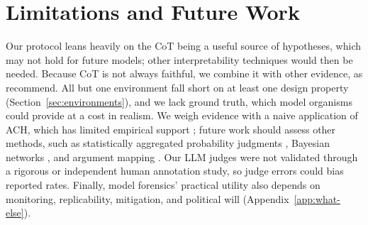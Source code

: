 \documentclass{article}
\begin{document}
\section{Limitations and Future Work}\label{sec:limitations}
Our protocol leans heavily on the CoT being a useful source of hypotheses, which may not hold for future models; other interpretability techniques would then be needed. Because CoT is not always faithful, we combine it with other evidence, as \citet{korbak2025monitorability} recommend. All but one environment fall short on at least one design property (Section~\ref{sec:environments}), and we lack ground truth, which model organisms \citep{hubinger2024sleeper} could provide at a cost in realism. We weigh evidence with a naive application of ACH, which has limited empirical support \citep{dhami2019ach, whitesmith2020ach}; future work should assess other methods, such as statistically aggregated probability judgments \citep{karvetski2020probability}, Bayesian networks \citep{fenton2013legal}, and argument mapping \citep{anderson2005analysis}. Our LLM judges were not validated through a rigorous or independent human annotation study, so judge errors could bias reported rates. Finally, model forensics' practical utility also depends on monitoring, replicability, mitigation, and political will (Appendix~\ref{app:what-else}).
\end{document}
